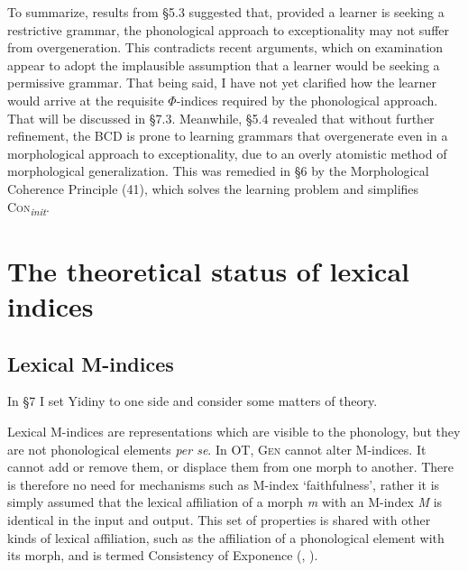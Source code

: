 \documentclass[output=paper,
modfonts
]{LSP/langsci}
\begin{document}
To summarize, results from §5.3 suggested that, provided a learner is seeking a restrictive grammar, the phonological approach to exceptionality may not suffer from overgeneration. This contradicts recent arguments, which on examination appear to adopt the implausible assumption that a learner would be seeking a permissive grammar. That being said, I have not yet clarified how the learner would arrive at the requisite $\Phi $-indices required by the phonological approach. That will be discussed in §7.3. Meanwhile, §5.4 revealed that without further refinement, the BCD is prone to learning grammars that overgenerate even in a morphological approach to exceptionality, due to an overly atomistic method of morphological generalization. This was remedied in §6 by the Morphological Coherence Principle (41), which solves the learning problem and simplifies \textsc{Con}\textit{\textsubscript{init}}.

\section[The theoretical status of lexical indices]{The theoretical status of lexical indices}
\label{bkm:Ref335653889}\subsection[Lexical M{}-indices]{Lexical M-indices}
\label{bkm:Ref335571912}
In §7 I set Yidiny to one side and consider some matters of theory.

Lexical M-indices are representations which are visible to the phonology, but they are not phonological elements \textit{per se}. In OT, \textsc{Gen} cannot alter M-indices. It cannot add or remove them, or displace them from one morph to another. There is therefore no need for mechanisms such as M-index `faithfulness', rather it is simply assumed that the lexical affiliation of a morph \textit{m} with an M-index \textit{M} is identical in the input and output. This set of properties is shared with other kinds of lexical affiliation, such as the affiliation of a phonological element with its morph, and is termed Consistency of Exponence (\citealt{mccarthy1993a}, \citealt{vanderived2007}).
\end{document}
